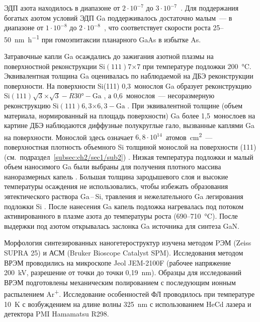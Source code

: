 ЭДП азота находилось в диапазоне от \(2 \cdot 10^{-7}\) до \(3 \cdot 10^{-7}\)~\si{\torr}. Для поддержания богатых азотом условий ЭДП Ga поддерживалось достаточно малым~--- в диапазоне от \(1 \cdot 10^{-8}\) до \(2 \cdot 10^{-8}\)~\si{\torr}, что соответствует скорости роста 25--50~\si{\nano\meter\per\hour} при гомоэпитаксии планарного GaAs в избытке As.

Затравочные капли Ga осаждались до зажигания азотной плазмы на поверхностной реконструкции Si\((111)7\)\(\times\)\(7\) при температуре подложки 200~\si{\degreeCelsius}. Эквивалентная толщина Ga оценивалась по наблюдаемой на ДБЭ реконструкции поверхности. На поверхности Si(111) 0,3~монослоя Ga образует реконструкцию Si\((111)\sqrt{3}\)\(\times\)\(\sqrt{3} - R30\si{\degree} - \text{Ga}\) \cite{Kawazu1988}, а 0,6~монослоя~--- несоразмерную реконструкцию Si\((111)6,3\)\(\times\)\(6,3 - \text{Ga}\) \cite{Cechal2007}. При эквивалентной толщине (объем материала, нормированный на площадь поверхности) Ga более 1,5~монослоев на картине ДБЭ наблюдаются диффузные полукруглые гало, вызванные каплями Ga на поверхности. Монослой здесь означает \(6,8 \cdot 10^{14}\)~атомов\si{\per\centi\meter^{2}}~--- поверхностная плотность объемного Si толщиной монослой на поверхности (111) (см.~подраздел~\cref{subsec:ch2/sec1/sub2}) \cite{Kumar2010}. Низкая температура подложки и малый объем наносимого Ga были выбраны для получения плотного массива наноразмерных капель \cite{Ristic2008}. Большая толщина зародышевого слоя и высокие температуры осаждения не использовались, чтобы избежать образования эвтектического раствора Ga\,--\,Si, травления и нежелательного Ga легирования подложки Si \cite{Yamane2009, Dadgar2015}. После нанесения Ga капель подложка нагревалась под потоком активированного в плазме азота до температуры роста (690--710~\si{\degreeCelsius}). После выдержки под азотом открывалась заслонка Ga источника для синтеза GaN.

Морфология синтезированных наногетероструктур изучена методом PЭМ (Zeiss SUPRA 25) и АСМ (Bruker Bioscope Catalyst SPM). Исследования методом ВРЭМ проводились на микроскопе Jeol JEM-2100F (рабочее напряжение 200~\si{\kilo\volt}, разрешение от точки до точки 0,19~\si{\nano\meter}). Образцы для исследований ВРЭМ подготовлены механическим полированием с последующим ионным распылением Ar\textsuperscript{+}. Исследование особенностей ФЛ проводилось при температуре 10~\si{\kelvin} с возбуждением на длине волны 325~\si{\nano\meter} с использованием HeCd лазера и детектора PMI Hamamatsu R298.


